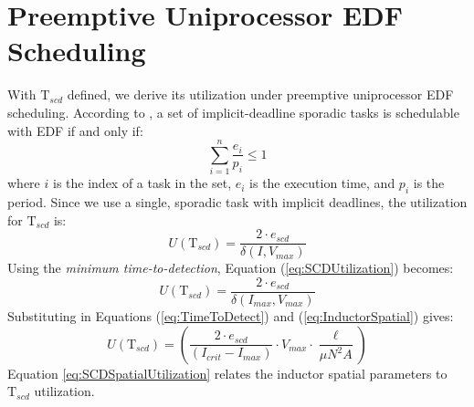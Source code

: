\documentclass[11pt,oneside]{report}
\begin{document}
    \section*{Preemptive Uniprocessor EDF Scheduling}
    With $\mathrm{T}_{scd}$ defined, we derive its utilization under preemptive uniprocessor EDF scheduling. According to \cite{LiuLayland}, a set of implicit-deadline sporadic tasks is schedulable with EDF if and only if:
    \begin{equation}\label{eq:EDFUtilization}
    \sum_{i=1}^{n} \frac{e_{i}}{p_{i}} \leq 1
    \end{equation}
    where $i$ is the index of a task in the set, $e_{i}$ is the execution time, and $p_{i}$ is the period. Since we use a single, sporadic task with implicit deadlines, the utilization for $\mathrm{T}_{scd}$ is:
    \begin{equation}\label{eq:SCDUtilization}
    U(\mathrm{T}_{scd}) = \frac{2 \cdot e_{scd}}{\delta(I,V_{max})}
    \end{equation}
    Using the \textit{minimum time-to-detection}, Equation (\ref{eq:SCDUtilization}) becomes:
    \begin{equation}\label{eq:SCDMinUtilization}
    U(\mathrm{T}_{scd}) = \frac{2 \cdot e_{scd}}{\delta(I_{max},V_{max})}
    \end{equation}
    Substituting in Equations (\ref{eq:TimeToDetect}) and (\ref{eq:InductorSpatial}) gives:
    \begin{equation}\label{eq:SCDSpatialUtilization}
    U(\mathrm{T}_{scd}) = (\frac{2 \cdot e_{scd}}{(I_{crit}-I_{max})} \cdot V_{max} \cdot \frac{\ell}{\mu N^{2}A})
    \end{equation}
    Equation \ref{eq:SCDSpatialUtilization} relates the inductor spatial parameters to $\mathrm{T}_{scd}$ utilization.
    
    
\end{document}
